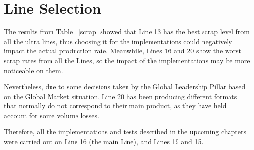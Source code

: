 \begin{table}[H]
\centering
{}
\caption{Scrap Benchmarking Levels in Ultra Lines P\&G Werk Crailsheim~[Author].}
\label{scrap}
\end{table}

\section{Line Selection}

The results from Table ~\ref{scrap} showed that Line 13 has the best scrap level from all the ultra lines, thus choosing it for the implementations could negatively impact the actual production rate. Meanwhile, Lines 16 and 20 show the worst scrap rates from all the Lines, so the impact of the implementations may be more noticeable on them. 

Nevertheless, due to some decisions taken by the Global Leadership Pillar based on the Global Market situation, Line 20 has been producing different formats that normally do not correspond to their main product, as they have held account for some volume losses. 

Therefore, all the implementations and tests described in the upcoming chapters were carried out on Line 16 (the main Line), and Lines 19 and 15.